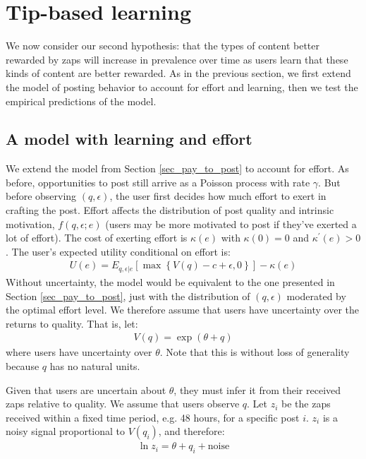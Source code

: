\section{Tip-based learning}\label{sec_v4v}

We now consider our second hypothesis: that the types of content better rewarded by zaps will increase in prevalence over time as users learn that these kinds of content are better rewarded. As in the previous section, we first extend the model of posting behavior to account for effort and learning, then we test the empirical predictions of the model.

\subsection{A model with learning and effort}

We extend the model from Section \ref{sec_pay_to_post} to account for effort. As before, opportunities to post still arrive as a Poisson process with rate $\gamma$. But before observing $(q,\epsilon)$, the user first decides how much effort to exert in crafting the post. Effort affects the distribution of post quality and intrinsic motivation, $f(q,\epsilon;e)$ (users may be more motivated to post if they've exerted a lot of effort). The cost of exerting effort is $\kappa(e)$ with $\kappa(0)=0$ and $\kappa^\prime(e)>0$.  The user's expected utility conditional on effort is:
\begin{align*}
U(e) = E_{q,\epsilon|e}\left[ \max \left\{ V(q) -c+\epsilon,0  \right\}\right] - \kappa(e)
\end{align*}
Without uncertainty, the model would be equivalent to the one presented in Section \ref{sec_pay_to_post}, just with the distribution of $(q,\epsilon)$ moderated by the optimal effort level. We therefore assume that users have uncertainty over the returns to quality. That is, let:
\begin{align}
V(q) = \exp\left(\theta + q\right)  \label{eq_Vq_exp_theta_q}
\end{align}
where users have uncertainty over $\theta$. Note that this is without loss of generality because $q$ has no natural units. 

Given that users are uncertain about $\theta$, they must infer it from their received zaps relative to quality. We assume that users observe $q$. Let $z_i$ be the zaps received within a fixed time period, e.g. 48 hours, for a specific post $i$.  $z_i$ is a noisy signal proportional to $V(q_i)$, and therefore:
\begin{align}
\ln z_i = \theta + q_i + \text{noise}  \label{eq_zi}
\end{align}

